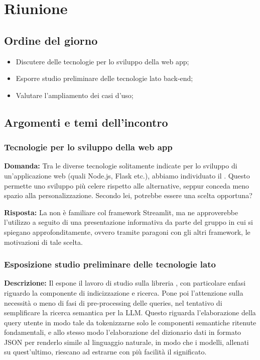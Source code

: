 \section{Riunione}
\subsection{Ordine del giorno}
\begin{itemize}
	\item Discutere delle tecnologie per lo sviluppo della web app;
	\item Esporre studio preliminare delle tecnologie lato back-end;
	\item Valutare l'ampliamento dei casi d'uso;
\end{itemize}

\subsection{Argomenti e temi dell'incontro}

\subsubsection{Tecnologie per lo sviluppo della web app}

\textbf{Domanda:} Tra le diverse tecnologie solitamente indicate per lo sviluppo di un'applicazione web (quali Node.js, Flask etc.), abbiamo individuato il  . 
Questo permette uno sviluppo  più celere rispetto alle alternative, seppur conceda meno spazio alla personalizzazione. 
Secondo lei, potrebbe essere una scelta opportuna?

\textbf{Risposta:} La  non è familiare col framework Streamlit, ma ne approverebbe l'utilizzo a seguito di una presentazione informativa da parte del gruppo in cui si spiegano approfonditamente, ovvero tramite paragoni con gli altri framework, le motivazioni di tale scelta.

\subsubsection{Esposizione studio preliminare delle tecnologie lato }

\textbf{Descrizione:} Il  espone il lavoro di studio sulla libreria , con particolare enfasi riguardo la componente di indicizzazione e ricerca. 
Pone poi l'attenzione sulla necessità o meno di fasi di pre-processing delle queries, nel tentativo di semplificare la ricerca semantica per la LLM. 
Questo riguarda l'elaborazione della query utente in modo tale da tokenizzarne solo le componenti semantiche ritenute fondamentali, e allo stesso modo l'elaborazione del dizionario dati in formato JSON per renderlo simile al linguaggio naturale, in modo che i modelli, allenati su quest'ultimo, riescano ad estrarne con più facilità il significato.

